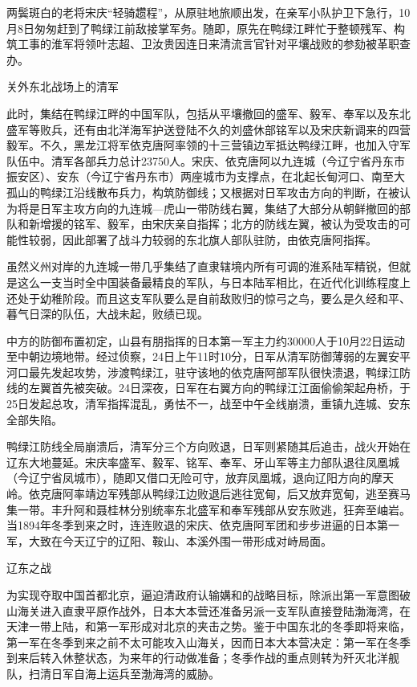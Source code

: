 \documentclass[12pt,UTF8]{ctexbook}
\begin{document}
两鬓斑白的老将宋庆“轻骑趱程”，从原驻地旅顺出发，在亲军小队护卫下急行，10月8日匆匆赶到了鸭绿江前敌接掌军务。随即，原先在鸭绿江畔忙于整顿残军、构筑工事的淮军将领叶志超、卫汝贵因连日来清流言官针对平壤战败的参劾被革职查办。


关外东北战场上的清军

此时，集结在鸭绿江畔的中国军队，包括从平壤撤回的盛军、毅军、奉军以及东北盛军等败兵，还有由北洋海军护送登陆不久的刘盛休部铭军以及宋庆新调来的四营毅军。不久，黑龙江将军依克唐阿率领的十三营镇边军抵达鸭绿江畔，也加入守军队伍中。清军各部兵力总计23750人。宋庆、依克唐阿以九连城（今辽宁省丹东市振安区）、安东（今辽宁省丹东市）两座城市为支撑点，在北起长甸河口、南至大孤山的鸭绿江沿线散布兵力，构筑防御线；又根据对日军攻击方向的判断，在被认为将是日军主攻方向的九连城—虎山一带防线右翼，集结了大部分从朝鲜撤回的部队和新增援的铭军、毅军，由宋庆亲自指挥；北方的防线左翼，被认为受攻击的可能性较弱，因此部署了战斗力较弱的东北旗人部队驻防，由依克唐阿指挥。

虽然义州对岸的九连城一带几乎集结了直隶辖境内所有可调的淮系陆军精锐，但就是这么一支当时全中国装备最精良的军队，与日本陆军相比，在近代化训练程度上还处于幼稚阶段。而且这支军队要么是自前敌败归的惊弓之鸟，要么是久经和平、暮气日深的队伍，大战未起，败绩已现。

中方的防御布置初定，山县有朋指挥的日本第一军主力约30000人于10月22日运动至中朝边境地带。经过侦察，24日上午11时10分，日军从清军防御薄弱的左翼安平河口最先发起攻势，涉渡鸭绿江，驻守该地的依克唐阿部军队很快溃退，鸭绿江防线的左翼首先被突破。24日深夜，日军在右翼方向的鸭绿江江面偷偷架起舟桥，于25日发起总攻，清军指挥混乱，勇怯不一，战至中午全线崩溃，重镇九连城、安东全部失陷。

鸭绿江防线全局崩溃后，清军分三个方向败退，日军则紧随其后追击，战火开始在辽东大地蔓延。宋庆率盛军、毅军、铭军、奉军、牙山军等主力部队退往凤凰城（今辽宁省凤城市），随即又借口无险可守，放弃凤凰城，退向辽阳方向的摩天岭。依克唐阿率靖边军残部从鸭绿江边败退后逃往宽甸，后又放弃宽甸，逃至赛马集一带。丰升阿和聂桂林分别统率东北盛军和奉军残部从安东败逃，狂奔至岫岩。当1894年冬季到来之时，连连败退的宋庆、依克唐阿军团和步步进逼的日本第一军，大致在今天辽宁的辽阳、鞍山、本溪外围一带形成对峙局面。

辽东之战

为实现夺取中国首都北京，逼迫清政府认输媾和的战略目标，除派出第一军意图破山海关进入直隶平原作战外，日本大本营还准备另派一支军队直接登陆渤海湾，在天津一带上陆，和第一军形成对北京的夹击之势。鉴于中国东北的冬季即将来临，第一军在冬季到来之前不太可能攻入山海关，因而日本大本营决定：第一军在冬季到来后转入休整状态，为来年的行动做准备；冬季作战的重点则转为歼灭北洋舰队，扫清日军自海上运兵至渤海湾的威胁。
\end{document}
